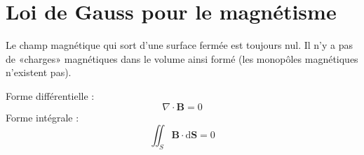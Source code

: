 \section{Loi de Gauss pour le magnétisme}
Le champ magnétique qui sort d’une surface fermée est toujours nul. Il n’y a pas de «charges» magnétiques dans le volume ainsi formé (les monopôles magnétiques n’existent pas).

Forme différentielle :
\[\nabla \cdot \boldsymbol{B} = 0\]
Forme intégrale :
\[\iint_{S} \boldsymbol{B} \cdot\mathrm{d}\boldsymbol{S} = 0\]


%
%
